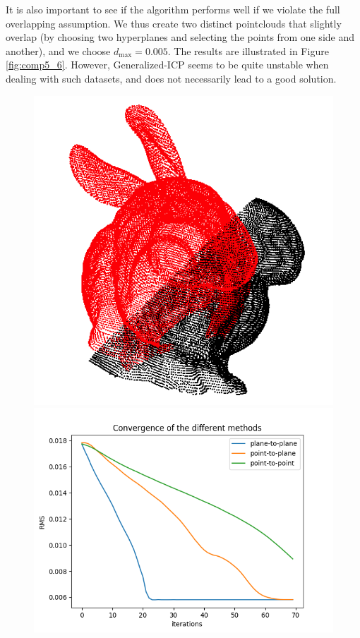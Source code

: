 \documentclass[11pt,letterpaper,leqno]{article}
\begin{document}
It is also important to see if the algorithm performs well if we violate the full overlapping assumption. We thus create two distinct pointclouds that slightly overlap (by choosing two hyperplanes and selecting the points from one side and another), and we choose $d_{\max} = 0.005$. The results are illustrated in Figure \ref{fig:comp5_6}. However, Generalized-ICP seems to be quite unstable when dealing with such datasets, and does not necessarily lead to a good solution.
\begin{figure}[ht!]
    \centering
    \begin{minipage}{0.4\linewidth}
    \includegraphics[width=\linewidth]{img/comparison_5_clouds.png}
    \end{minipage}\hfill
    \begin{minipage}{0.5\linewidth}
    \includegraphics[width=\linewidth]{img/comparison_5.png}

\end{minipage}
\end{figure}
\end{document}
